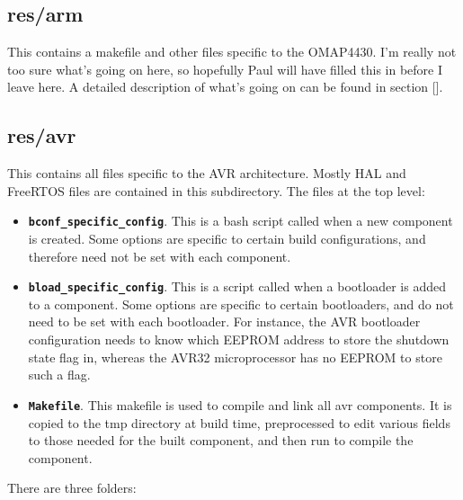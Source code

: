 \documentclass[a4paper, oneside, 11pt, titlepage, onecolumn, openright]{report}
\begin{document}
\subsection{res/arm}
			\label{ss:res/arm}
			This contains a makefile and other files specific to the OMAP4430. I'm really not too sure what's going on here, so hopefully Paul will have filled this in before I leave here. A detailed description of what's going on can be found in section [].
			
\subsection{res/avr}
			\label{ss:res/avr}
			This contains all files specific to the AVR architecture. Mostly HAL and FreeRTOS files are contained in this subdirectory. The files at the top level:
			
\begin{itemize}

\item \textbf{\texttt{bconf\_specific\_config}}. This is a bash script called when a new component is created. Some options are specific to certain build configurations, and therefore need not be set with each component. 

\item \textbf{\texttt{bload\_specific\_config}}. This is a script called when a bootloader is added to a component. Some options are specific to certain bootloaders, and do not need to be set with each bootloader. For instance, the AVR bootloader configuration needs to know which EEPROM address to store the shutdown state flag in, whereas the AVR32 microprocessor has no EEPROM to store such a flag.

\item \textbf{\texttt{Makefile}}. This makefile is used to compile and link all avr components. It is copied to the tmp directory at build time, preprocessed to edit various fields to those needed for the built component, and then run to compile the component.

\end{itemize}					

There are three folders:
\end{document}
